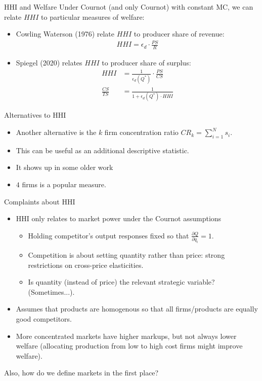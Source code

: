 \documentclass[xcolor=pdftex,dvipsnames,table,mathserif,aspectratio=169]{beamer}
\begin{document}
\begin{frame}{HHI and Welfare}
Under Cournot (and only Cournot) with constant MC, we can relate $HHI$ to particular measures of welfare:
\begin{itemize}
\item Cowling Waterson (1976) relate $HHI$ to producer share of revenue:
\begin{align*}
HHI =  \epsilon_d \cdot \frac{PS}{R}
\end{align*}
\item Spiegel (2020) relates $HHI$ to producer share of surplus:
\begin{align*}
HHI &=  \frac{1}{\epsilon_d \left(Q^{*}\right)} \cdot \frac{PS}{CS}\\
\frac{C S}{TS} &=\frac{1}{1+\epsilon_d \left(Q^{*}\right) \cdot HHI}
\end{align*}
\end{itemize}
\end{frame}

\begin{frame}{Alternatives to HHI}
\begin{itemize}
\item Another alternative is the $k$ firm concentration ratio $CR_k = \sum_{i=1}^N s_i$.
\item This can be useful as an additional descriptive statistic.
\item It shows up in some older work
\item $4$ firms is a popular measure.
\end{itemize}
\end{frame}


\begin{frame}{Complaints about HHI}
\begin{itemize}
\item HHI only relates to market power under the Cournot assumptions
\begin{itemize}
\item Holding competitor's output responses fixed so that $\frac{\partial Q}{\partial q_i} =1$.
\item Competition is about setting quantity rather than price: strong restrictions on cross-price elasticities.
\item Is quantity (instead of price) the relevant strategic variable? (Sometimes...).
\end{itemize}
\item Assumes that products are \alert{homogenous} so that all firms/products are equally good competitors.
\item More concentrated markets have higher markups, but not always lower welfare (allocating production from low to high cost firms might improve welfare).
\end{itemize}
Also, how do we \alert{define markets} in the first place?
\end{frame}
\end{document}
